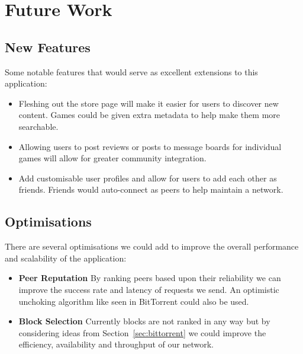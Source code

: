 \section{Future Work}

\subsection*{New Features}

Some notable features that would serve as excellent extensions to this application:

\begin{itemize}
  \item Fleshing out the store page will make it easier for users to discover new content. Games could be given extra metadata to help make them more searchable.
  \item Allowing users to post reviews or posts to message boards for individual games will allow for greater community integration.
  \item Add customisable user profiles and allow for users to add each other as friends. Friends would auto-connect as peers to help maintain a network.
\end{itemize}


\subsection*{Optimisations}

There are several optimisations we could add to improve the overall performance and scalability of the application:

\begin{itemize}
  \item \textbf{Peer Reputation} By ranking peers based upon their reliability we can improve the success rate and latency of requests we send. An optimistic unchoking algorithm like seen in BitTorrent could also be used.
  \item \textbf{Block Selection} Currently blocks are not ranked in any way but by considering ideas from Section~\ref{sec:bittorrent} we could improve the efficiency, availability and throughput of our network.
\end{itemize}
